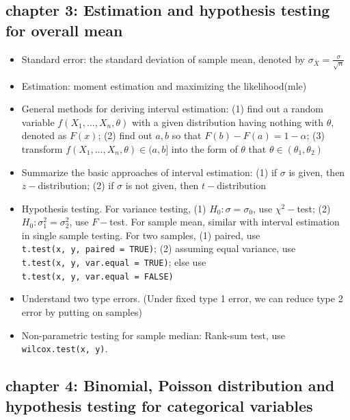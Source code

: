 \documentclass{article}
\begin{document}
\hypertarget{chapter-3-estimation-and-hypothesis-testing-for-overall-mean}{%
\subsection{chapter 3: Estimation and hypothesis testing for overall
mean}\label{chapter-3-estimation-and-hypothesis-testing-for-overall-mean}}

\begin{itemize}
\tightlist
\item
  Standard error: the standard deviation of sample mean, denoted by
  \(\sigma_{\bar{X}} = \frac{\sigma}{\sqrt{n}}\)
\item
  Estimation: moment estimation and maximizing the likelihood(mle)
\item
  General methods for deriving interval estimation: (1) find out a
  random variable \(f(X_1, \dots, X_n, \theta)\) with a given
  distribution having nothing with \(\theta\), denoted as \(F(x)\); (2)
  find out \(a, b\) so that \(F(b) - F(a) = 1- \alpha\); (3) transform
  \(f(X_1, \dots, X_n, \theta) \in (a, b]\) into the form of \(\theta\)
  that \(\theta \in (\theta_1, \theta_2)\)
\item
  Summarize the basic approaches of interval estimation: (1) if
  \(\sigma\) is given, then \(z-\)distribution; (2) if \(\sigma\) is not
  given, then \(t-\)distribution
\item
  Hypothesis testing. For variance testing, (1)
  \(H_0: \sigma = \sigma_0\), use \(\chi^2-\)test; (2)
  \(H_0: \sigma_1^2 = \sigma_2^2\), use \(F-\)test. For sample mean,
  similar with interval estimation in single sample testing. For two
  samples, (1) paired, use \texttt{t.test(x,\ y,\ paired\ =\ TRUE)}; (2)
  assuming equal variance, use
  \texttt{t.test(x,\ y,\ var.equal\ =\ TRUE)}; else use
  \texttt{t.test(x,\ y,\ var.equal\ =\ FALSE)}
\item
  Understand two type errors. (Under fixed type 1 error, we can reduce
  type 2 error by putting on samples)
\item
  Non-parametric testing for sample median: Rank-sum test, use
  \texttt{wilcox.test(x,\ y)}.
\end{itemize}

\hypertarget{chapter-4-binomial-poisson-distribution-and-hypothesis-testing-for-categorical-variables}{%
\subsection{chapter 4: Binomial, Poisson distribution and hypothesis
testing for categorical
variables}\label{chapter-4-binomial-poisson-distribution-and-hypothesis-testing-for-categorical-variables}}
\end{document}
